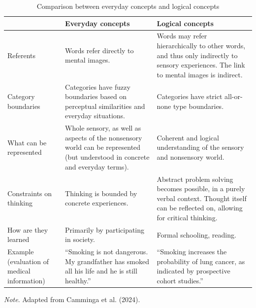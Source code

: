\documentclass[authordate, reflection]{jote-new-article}
\begin{document}
	\begin{table}
		\begin{fullwidth}
			\begin{threeparttable}
				\caption{Comparison between everyday concepts and logical concepts}
				\begin{tabularx}{\linewidth}{@{} >{\RaggedRight\arraybackslash}p{11.5em} >{\RaggedRight\arraybackslash}X >{\RaggedRight\arraybackslash}X @{}}
					\toprule   & Everyday concepts & Logical concepts \\

					\midrule Referents & Words refer directly to mental images.  &
					Words may refer hierarchically to other words, and thus only indirectly to sensory experiences. The link to mental images is indirect.
					\\

					Category boundaries &
					Categories have fuzzy boundaries based on perceptual similarities and everyday situations.
					& Categories have strict all-or-none type boundaries. \\

					What can be represented &
					Whole sensory, as well as aspects of the nonsensory world can be represented (but understood in concrete and everyday terms).
					& Coherent and logical understanding of the sensory and nonsensory world.
					\\

					Constraints on thinking & Thinking is bounded by concrete experiences. &
					Abstract problem solving becomes possible, in a purely verbal context. Thought itself can be reflected on, allowing for critical thinking.
					\\

					How are they learned & Primarily by participating in society. &
					Formal schooling, reading. \\

					\midrule Example (evaluation of medical information) & “Smoking is not dangerous. My grandfather has smoked all his life and he is still healthy.”
					& “Smoking increases the probability of lung cancer, as indicated by prospective cohort studies.”
					\\
					\bottomrule


				\end{tabularx}
				\vspace{3pt}
				\emph{Note}. Adapted from Camminga et al. (2024).
			\end{threeparttable}
		\end{fullwidth}
	\end{table}
\end{document}
